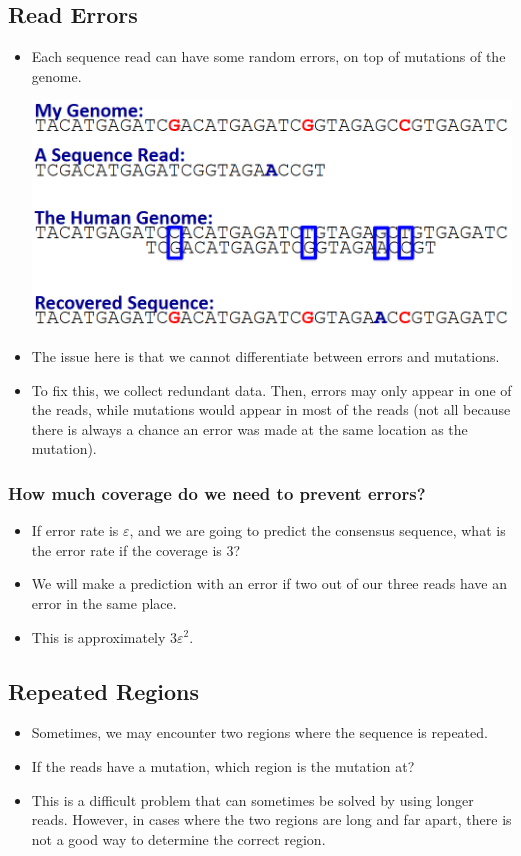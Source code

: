 \documentclass[10pt]{article}
\begin{document}
\subsection*{Read Errors}
\begin{itemize}
    \item Each sequence read can have some random errors, on top of mutations of the genome.
    \begin{center}
        \includegraphics*[scale=0.5]{W1_4.png}
    \end{center}
    \item The issue here is that we cannot differentiate between errors and mutations.
    \item To fix this, we collect redundant data.  Then, errors may only appear in one of the reads, while mutations would appear in most of the reads (not all because there is always a chance an error was made at the same location as the mutation).
\end{itemize}
\subsubsection*{How much coverage do we need to prevent errors?}
\begin{itemize}
    \item If error rate is $\varepsilon$, and we are going to predict the consensus sequence, what is the error rate if the coverage is 3?
    \item We will make a prediction with an error if two out of our three reads have an error in the same place.
    \item This is approximately $3\varepsilon^2$. 
\end{itemize}
\subsection*{Repeated Regions}
\begin{itemize}
    \item Sometimes, we may encounter two regions where the sequence is repeated.
    \item If the reads have a mutation, which region is the mutation at?
    \item This is a difficult problem that can sometimes be solved by using longer reads.  However, in cases where the two regions are long and far apart, there is not a good way to determine the correct region.
\end{itemize}
\end{document}
